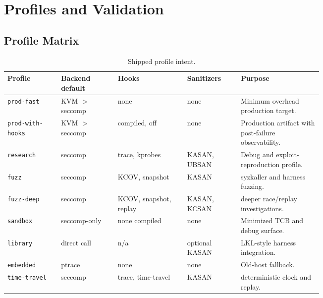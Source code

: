 \section{Profiles and Validation}

\subsection{Profile Matrix}

\begin{table}[h]
\centering
\caption{Shipped profile intent.}
\small
\begin{tabularx}{\linewidth}{@{}p{0.17\linewidth}p{0.18\linewidth}p{0.22\linewidth}p{0.17\linewidth}X@{}}
\toprule
Profile & Backend default & Hooks & Sanitizers & Purpose \\
\midrule
\texttt{prod-fast} & KVM $>$ seccomp & none & none & Minimum overhead production target. \\
\texttt{prod-with-hooks} & KVM $>$ seccomp & compiled, off & none & Production artifact with post-failure observability. \\
\texttt{research} & seccomp & trace, kprobes & KASAN, UBSAN & Debug and exploit-reproduction profile. \\
\texttt{fuzz} & seccomp & KCOV, snapshot & KASAN & syzkaller and harness fuzzing. \\
\texttt{fuzz-deep} & seccomp & KCOV, snapshot, replay & KASAN, KCSAN & deeper race/replay investigations. \\
\texttt{sandbox} & seccomp-only & none compiled & none & Minimized TCB and debug surface. \\
\texttt{library} & direct call & n/a & optional KASAN & LKL-style harness integration. \\
\texttt{embedded} & ptrace & none & none & Old-host fallback. \\
\texttt{time-travel} & seccomp & trace, time-travel & KASAN & deterministic clock and replay. \\
\bottomrule
\end{tabularx}
\end{table}

